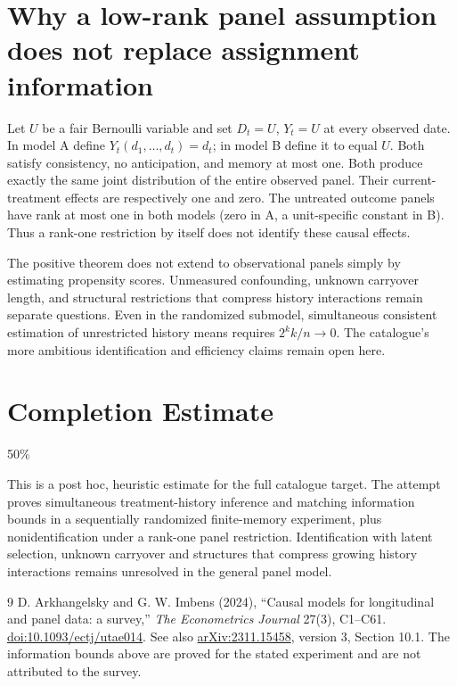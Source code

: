 \documentclass[11pt,a4paper]{article}
\theoremstyle{remark}
\begin{document}
\section{Why a low-rank panel assumption does not replace assignment information}
Let $U$ be a fair Bernoulli variable and set $D_t=U$, $Y_t=U$ at every observed date. In model A define $Y_t(d_1,\ldots,d_t)=d_t$; in model B define it to equal $U$. Both satisfy consistency, no anticipation, and memory at most one. Both produce exactly the same joint distribution of the entire observed panel. Their current-treatment effects are respectively one and zero. The untreated outcome panels have rank at most one in both models (zero in A, a unit-specific constant in B). Thus a rank-one restriction by itself does not identify these causal effects.

The positive theorem does not extend to observational panels simply by estimating propensity scores. Unmeasured confounding, unknown carryover length, and structural restrictions that compress history interactions remain separate questions. Even in the randomized submodel, simultaneous consistent estimation of unrestricted history means requires $2^k k/n\to0$. The catalogue's more ambitious identification and efficiency claims remain open here.

\section{Completion Estimate}
50\%

This is a post hoc, heuristic estimate for the full catalogue target.
The attempt proves simultaneous treatment-history inference and matching information bounds in a sequentially randomized finite-memory experiment, plus nonidentification under a rank-one panel restriction. Identification with latent selection, unknown carryover and structures that compress growing history interactions remains unresolved in the general panel model.

\begin{thebibliography}{9}
 D. Arkhangelsky and G. W. Imbens (2024), ``Causal models for longitudinal and panel data: a survey,'' \emph{The Econometrics Journal} 27(3), C1--C61. \href{https://doi.org/10.1093/ectj/utae014}{doi:10.1093/ectj/utae014}. See also \href{https://arxiv.org/abs/2311.15458}{arXiv:2311.15458}, version 3, Section 10.1. The information bounds above are proved for the stated experiment and are not attributed to the survey.
\end{thebibliography}
\end{document}
